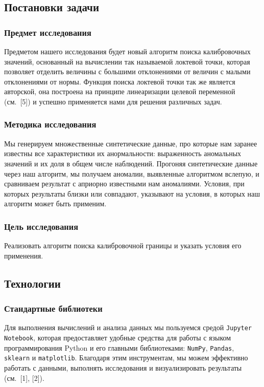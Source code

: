 \documentclass[a4paper,12pt]{article}
\begin{document}
\subsection{Постановки задачи}

\subsubsection{Предмет исследования}

Предметом нашего исследования будет новый алгоритм поиска калибровочных значений, основанный на вычислении так называемой локтевой точки, которая позволяет отделить величины с большими отклонениями от величин с малыми отклонениями от нормы. Функция поиска локтевой точки так же является авторской, она построена на принципе линеаризации целевой переменной (см. [5]) и успешно применяется нами для решения различных задач.

\subsubsection{Методика исследования} 

Мы генерируем множественные синтетические данные, про которые нам заранее известны все характеристики их анормальности: выраженность аномальных значений и их доля в общем числе наблюдений. Прогоняя синтетические данные через наш алгоритм, мы получаем аномалии, выявленные алгоритмом вслепую, и сравниваем результат с априорно известными нам аномалиями. Условия, при которых результаты близки или совпадают, указывают на условия, в которых наш алгоритм может быть применим.

\subsubsection{Цель исследования} 

Реализовать алгоритм поиска калибровочной границы и указать условия его применения.

\subsection{Технологии}

\subsubsection{Стандартные библиотеки}

Для выполнения вычислений и анализа данных мы пользуемся средой \texttt{Jupyter Notebook}, которая предоставляет удобные средства для работы с языком программирования Python и его главными библиотеками: \texttt{NumPy}, \texttt{Pandas}, \texttt{sklearn} и \texttt{matplotlib}. Благодаря этим инструментам, мы можем эффективно работать с данными, выполнять исследования и визуализировать результаты (см. [1], [2]). 
\end{document}
